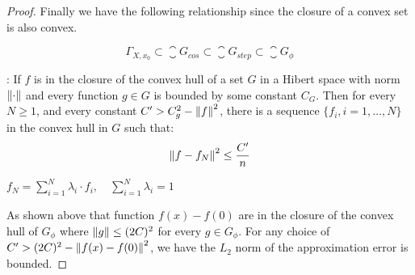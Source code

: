 \begin{proof}
    Finally we have the following relationship since the closure of a convex set
    is also convex.

    \begin{equation*}
        \Gamma_{X, x_0} \subset \closure{G_{cos}} \subset \closure{G_{step}} \subset \closure{G_{\phi}}
    \end{equation*}

    \cite[\textit{Lemma~1}]{barronUniversalApproximationBounds1993}: If $f$ is
    in the closure of the convex hull of a set $G$ in a Hibert space with norm
    $\left\| \cdot \right\|$ and every function $g \in G$ is bounded by some constant
    $C_G$. Then for every $N \geq 1$, and every constant $C' > C_g^2 -
        \left\| f \right\|^2$, there is a sequence $\{f_i, i = 1, \dots, N\}$ in the convex
    hull in $G$ such that:
    \begin{equation}
        \left\| f - f_N \right\|^2 \leq \frac{C'}{n}
    \end{equation}

    $f_N = \sum_{i=1}^N \lambda_i \cdot f_i, \quad \sum_{i=1}^N \lambda_i = 1$


    As shown above that function $f(x) - f(0)$ are in the closure of the convex
    hull of $G_{\phi}$ where $\left\| g \right\| \leq (2C)^2$ for every $g \in G_{\phi}$.
    For any choice of $C' > (2C)^2 - \left\| f(x) - f(0) \right\|^2$, we have the $L_2$
    norm of the approximation error is bounded.




\end{proof}


